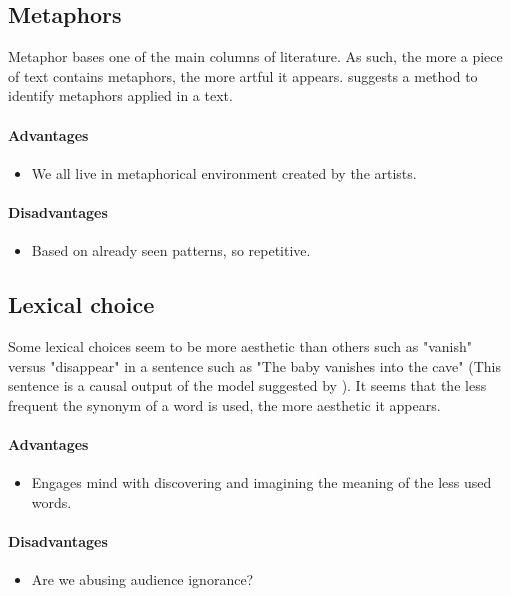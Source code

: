 \documentclass{article}
\begin{document}
			\subsection{Metaphors}\label{sec:metaphor}
			Metaphor bases one of the main columns of literature. As such, the more a piece of text contains metaphors, the more artful it appears.  \citet{mao-2018-word-embedding-and-wordnet-based-metaphor-identification-and-interpretation} suggests a method to identify metaphors applied in a text.    
				\paragraph{Advantages}
					\begin{itemize}
						\item We all live in metaphorical environment created by the artists. 
					\end{itemize}
				\paragraph{Disadvantages}
					\begin{itemize}
						\item Based on already seen patterns, so repetitive.   
					\end{itemize}
			\subsection{Lexical choice} 
			Some lexical choices seem to be more aesthetic than others such as "vanish" versus "disappear" in a sentence such as "The baby vanishes into the cave" (This sentence is a causal output of the model suggested by \citet{mcintyre-2009-learning-to-tell-tales-a-data-driven-approach-to-story-generation}). It seems that the less frequent the synonym of a word is used, the more aesthetic it appears. 
				\paragraph{Advantages}
					\begin{itemize}
						\item Engages mind with discovering and imagining the meaning of the less used words.  
					\end{itemize}
				\paragraph{Disadvantages}
					\begin{itemize}
						\item Are we abusing audience ignorance?
					\end{itemize}
\end{document}
